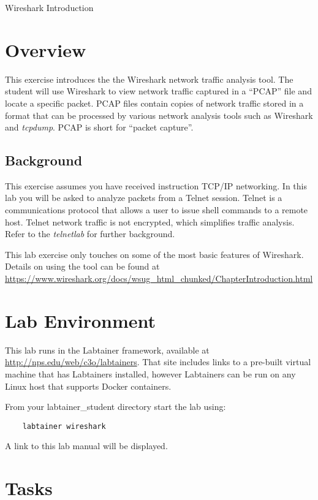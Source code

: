 


\begin{center}
{\LARGE Wireshark Introduction}
\vspace{0.1in}\\
\end{center}


\section{Overview}
This exercise introduces the the Wireshark network traffic analysis tool.
The student will use Wireshark to view network traffic captured in a ``PCAP''
file and locate a specific packet.  PCAP files contain
copies of network traffic stored in a format that can be processed
by various network analysis tools such as Wireshark and
\textit{tcpdump}.  PCAP is short for ``packet capture''.

\subsection{Background}
This exercise assumes you have received instruction TCP/IP networking.
In this lab you will be asked to analyze packets from a Telnet session.  Telnet is a communications protocol that allows a user to 
issue shell commands to a remote host. Telnet network 
traffic is not encrypted, which simplifies traffic analysis. Refer to the \textit{telnetlab} for further background.

This lab exercise only touches on some of the most basic features of Wireshark.
Details on using the tool can be found at \url{https://www.wireshark.org/docs/wsug\_html\_chunked/ChapterIntroduction.html}

\section{Lab Environment}
This lab runs in the Labtainer framework,
available at \url{http://nps.edu/web/c3o/labtainers}.
That site includes links to a pre-built virtual machine
that has Labtainers installed, however Labtainers can
be run on any Linux host that supports Docker containers.

From your labtainer_student directory start the lab using:
\begin{verbatim}
    labtainer wireshark
\end{verbatim}
A link to this lab manual will be displayed.

\section{Tasks}
